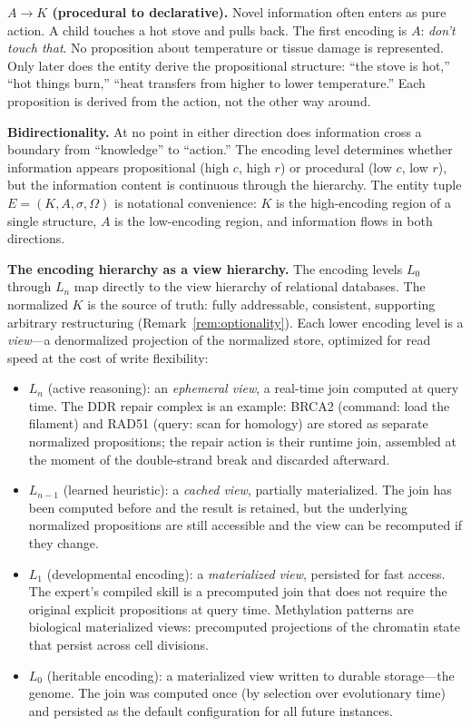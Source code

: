 \documentclass[11pt]{article}
\theoremstyle{definition}
\theoremstyle{remark}
\begin{document}
\textbf{$A \to K$ (procedural to declarative).}
Novel information often enters as pure action. A child touches a hot
stove and pulls back. The first encoding is $A$: \emph{don't touch
that}. No proposition about temperature or tissue damage is represented.
Only later does the entity derive the propositional structure: ``the
stove is hot,'' ``hot things burn,'' ``heat transfers from higher to
lower temperature.'' Each proposition is derived from the action, not
the other way around.

\textbf{Bidirectionality.}
At no point in either direction does information cross a boundary from
``knowledge'' to ``action.'' The encoding level determines whether
information appears propositional (high $c$, high $r$) or procedural
(low $c$, low $r$), but the information content is continuous through the
hierarchy. The entity tuple $E = (K, A, \sigma, \Omega)$ is notational
convenience: $K$ is the high-encoding region of a single structure, $A$
is the low-encoding region, and information flows in both directions.

\textbf{The encoding hierarchy as a view hierarchy.}
The encoding levels $L_0$ through $L_n$ map directly to the view
hierarchy of relational databases. The normalized $K$ is the source of
truth: fully addressable, consistent, supporting arbitrary
restructuring (Remark~\ref{rem:optionality}). Each lower encoding
level is a \emph{view}---a denormalized projection of the normalized
store, optimized for read speed at the cost of write flexibility:
\begin{itemize}
\item $L_n$ (active reasoning): an \emph{ephemeral view}, a real-time
   join computed at query time. The DDR repair complex is an example:
   BRCA2 (command: load the filament) and RAD51 (query: scan for
   homology) are stored as separate normalized propositions; the repair
   action is their runtime join, assembled at the moment of the
   double-strand break and discarded afterward.
\item $L_{n-1}$ (learned heuristic): a \emph{cached view}, partially
   materialized. The join has been computed before and the result is
   retained, but the underlying normalized propositions are still
   accessible and the view can be recomputed if they change.
\item $L_1$ (developmental encoding): a \emph{materialized view},
   persisted for fast access. The expert's compiled skill is a
   precomputed join that does not require the original explicit
   propositions at query time. Methylation patterns are biological
   materialized views: precomputed projections of the chromatin state
   that persist across cell divisions.
\item $L_0$ (heritable encoding): a materialized view written to
   durable storage---the genome. The join was computed once (by
   selection over evolutionary time) and persisted as the default
   configuration for all future instances.
\end{itemize}
\end{document}
